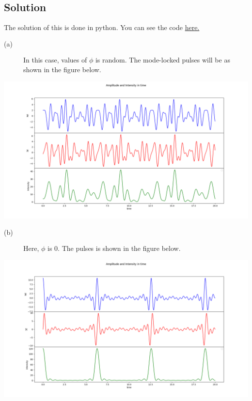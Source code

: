 \documentclass[a4paper,11pt]{article}
\begin{document}
\subsection*{Solution}
\label{sec:org7741e73}
The solution of this is done in python. You can see the code \href{https://github.com/varghesereji/Coursework\_assignments/blob/main/CQO/Ass\_2/Problem\_7\_answer\_code.py}{here.}
\begin{description}
\item[{(a)}] In this case, values of \(\phi\) is random.  The mode-locked pulses will be as shown in the figure below.
\end{description}
\begin{center}
\includegraphics[width=.9\linewidth]{pr_7_a.png}
\end{center}
\begin{description}
\item[{(b)}] Here, \(\phi\) is 0. The pulses is shown in the figure below.
\end{description}
\begin{center}
\includegraphics[width=.9\linewidth]{pr_7_b.png}
\end{center}

\newpage
\end{document}
